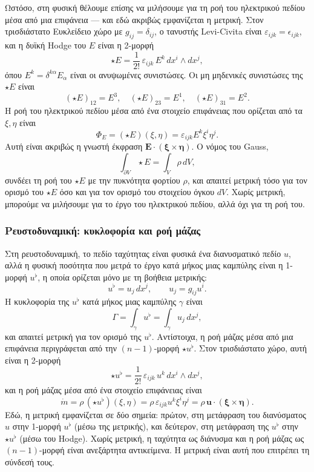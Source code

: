 \documentclass[12pt]{article}
\begin{document}
Ωστόσο, στη φυσική θέλουμε επίσης να μιλήσουμε για τη ροή του ηλεκτρικού πεδίου μέσα από μια επιφάνεια — και εδώ ακριβώς εμφανίζεται η μετρική. Στον τρισδιάστατο Ευκλείδειο χώρο με $g_{ij} = \delta_{ij}$, ο τανυστής Levi-Civita είναι $\varepsilon_{ijk} = \epsilon_{ijk}$, και η δυϊκή Hodge του $E$ είναι η 2-μορφή
\[
\star E = \frac{1}{2!} \, \varepsilon_{ijk} \, E^k \, dx^i \wedge dx^j,
\]
όπου $E^k = \delta^{k\alpha} E_\alpha$ είναι οι ανυψωμένες συνιστώσες. Οι μη μηδενικές συνιστώσες της $\star E$ είναι
\[
(\star E)_{12} = E^3, \quad (\star E)_{23} = E^1, \quad (\star E)_{31} = E^2.
\]
Η ροή του ηλεκτρικού πεδίου μέσα από ένα στοιχείο επιφάνειας που ορίζεται από τα $\xi, \eta$ είναι
\[
\Phi_E = (\star E)(\xi, \eta) = \varepsilon_{ijk} E^k \xi^i \eta^j.
\]
Αυτή είναι ακριβώς η γνωστή έκφραση $\mathbf{E} \cdot (\boldsymbol{\xi} \times \boldsymbol{\eta})$. Ο νόμος του Gauss,
\[
\int_{\partial V} \star E = \int_V \rho \, dV,
\]
συνδέει τη ροή του $\star E$ με την πυκνότητα φορτίου $\rho$, και απαιτεί μετρική τόσο για τον ορισμό του $\star E$ όσο και για τον ορισμό του στοιχείου όγκου $dV$. Χωρίς μετρική, μπορούμε να μιλήσουμε για το έργο του ηλεκτρικού πεδίου, αλλά όχι για τη ροή του.

\subsubsection{Ρευστοδυναμική: κυκλοφορία και ροή μάζας}

Στη ρευστοδυναμική, το πεδίο ταχύτητας είναι φυσικά ένα διανυσματικό πεδίο $u$, αλλά η φυσική ποσότητα που μετρά το έργο κατά μήκος μιας καμπύλης είναι η 1-μορφή $u^\flat$, η οποία ορίζεται μόνο με τη βοήθεια μετρικής:
\[
u^\flat = u_j \, dx^j, \qquad u_j = g_{ij} u^i.
\]
Η κυκλοφορία της $u^\flat$ κατά μήκος μιας καμπύλης $\gamma$ είναι
\[
\Gamma = \int_\gamma u^\flat = \int_\gamma u_j \, dx^j,
\]
και απαιτεί μετρική για τον ορισμό της $u^\flat$. Αντίστοιχα, η ροή μάζας μέσα από μια επιφάνεια περιγράφεται από την $(n-1)$-μορφή $\star u^\flat$. Στον τρισδιάστατο χώρο, αυτή είναι η 2-μορφή
\[
\star u^\flat = \frac{1}{2!} \, \varepsilon_{ijk} \, u^k \, dx^i \wedge dx^j,
\]
και η ροή μάζας μέσα από ένα στοιχείο επιφάνειας είναι
\[
\dot{m} = \rho \, (\star u^\flat)(\xi, \eta) = \rho \, \varepsilon_{ijk} u^k \xi^i \eta^j = \rho \, \mathbf{u} \cdot (\boldsymbol{\xi} \times \boldsymbol{\eta}).
\]
Εδώ, η μετρική εμφανίζεται σε δύο σημεία: πρώτον, στη μετάφραση του διανύσματος $u$ στην 1-μορφή $u^\flat$ (μέσω της μετρικής), και δεύτερον, στη μετάφραση της $u^\flat$ στην $\star u^\flat$ (μέσω του Hodge). Χωρίς μετρική, η ταχύτητα ως διάνυσμα και η ροή μάζας ως $(n-1)$-μορφή είναι ανεξάρτητα αντικείμενα. Η μετρική είναι αυτή που επιτρέπει τη σύνδεσή τους.
\end{document}
